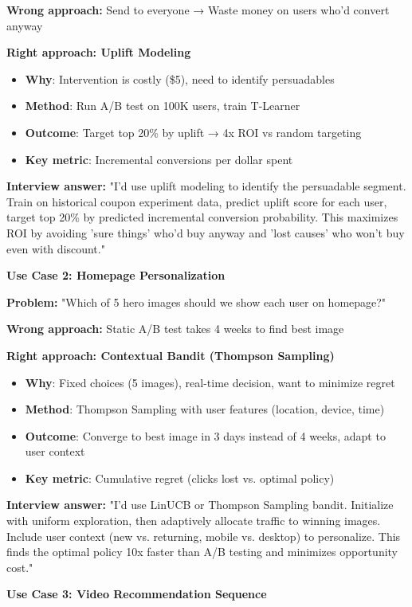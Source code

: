 \documentclass[10pt]{article}
\begin{document}
\textbf{Wrong approach:} Send to everyone → Waste money on users who'd convert anyway

\textbf{Right approach: Uplift Modeling}
\begin{itemize}
\item \textbf{Why}: Intervention is costly (\$5), need to identify persuadables
\item \textbf{Method}: Run A/B test on 100K users, train T-Learner
\item \textbf{Outcome}: Target top 20\% by uplift → 4x ROI vs random targeting
\item \textbf{Key metric}: Incremental conversions per dollar spent
\end{itemize}

\textbf{Interview answer:} "I'd use uplift modeling to identify the persuadable segment. Train on historical coupon experiment data, predict uplift score for each user, target top 20\% by predicted incremental conversion probability. This maximizes ROI by avoiding 'sure things' who'd buy anyway and 'lost causes' who won't buy even with discount."

\textbf{Use Case 2: Homepage Personalization}

\textbf{Problem:} "Which of 5 hero images should we show each user on homepage?"

\textbf{Wrong approach:} Static A/B test takes 4 weeks to find best image

\textbf{Right approach: Contextual Bandit (Thompson Sampling)}
\begin{itemize}
\item \textbf{Why}: Fixed choices (5 images), real-time decision, want to minimize regret
\item \textbf{Method}: Thompson Sampling with user features (location, device, time)
\item \textbf{Outcome}: Converge to best image in 3 days instead of 4 weeks, adapt to user context
\item \textbf{Key metric}: Cumulative regret (clicks lost vs. optimal policy)
\end{itemize}

\textbf{Interview answer:} "I'd use LinUCB or Thompson Sampling bandit. Initialize with uniform exploration, then adaptively allocate traffic to winning images. Include user context (new vs. returning, mobile vs. desktop) to personalize. This finds the optimal policy 10x faster than A/B testing and minimizes opportunity cost."

\textbf{Use Case 3: Video Recommendation Sequence}
\end{document}
